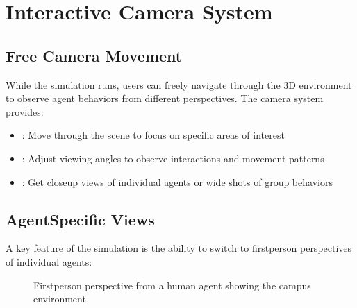 \documentclass[letterpaper,10pt,english]{jupyterBook}
\begin{document}
\section{Interactive Camera System}
\label{\detokenize{The Simulation:interactive-camera-system}}

\subsection{Free Camera Movement}
\label{\detokenize{The Simulation:free-camera-movement}}
\sphinxAtStartPar
While the simulation runs, users can freely navigate through the 3D environment to observe agent behaviors from different perspectives. The camera system provides:
\begin{itemize}
\item {} 
\sphinxAtStartPar
{}: Move through the scene to focus on specific areas of interest

\item {} 
\sphinxAtStartPar
{}: Adjust viewing angles to observe interactions and movement patterns

\item {} 
\sphinxAtStartPar
{}: Get close\sphinxhyphen{}up views of individual agents or wide shots of group behaviors

\end{itemize}


\subsection{Agent\sphinxhyphen{}Specific Views}
\label{\detokenize{The Simulation:agent-specific-views}}
\sphinxAtStartPar
A key feature of the simulation is the ability to switch to first\sphinxhyphen{}person perspectives of individual agents:

\begin{figure}[htbp]
\centering
\capstart

\noindent{}
\caption{First\sphinxhyphen{}person perspective from a human agent showing the campus environment}\label{\detokenize{The Simulation:human-agent-first-person-view}}\end{figure}
\end{document}
